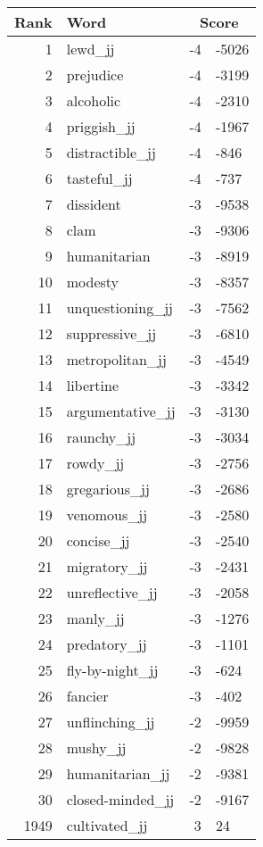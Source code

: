 \begin{longtable}[!htbp]{| rlr@{.}l |}
    \hline
    \textbf{Rank} & \textbf{Word} & \multicolumn{2}{c|}{\textbf{Score}} \\
    \hline
    \endhead
    1 & lewd\_jj & -4 & -5026 \\
    2 & prejudice & -4 & -3199 \\
    3 & alcoholic & -4 & -2310 \\
    4 & priggish\_jj & -4 & -1967 \\
    5 & distractible\_jj & -4 & -846 \\
    6 & tasteful\_jj & -4 & -737 \\
    7 & dissident & -3 & -9538 \\
    8 & clam & -3 & -9306 \\
    9 & humanitarian & -3 & -8919 \\
    10 & modesty & -3 & -8357 \\
    11 & unquestioning\_jj & -3 & -7562 \\
    12 & suppressive\_jj & -3 & -6810 \\
    13 & metropolitan\_jj & -3 & -4549 \\
    14 & libertine & -3 & -3342 \\
    15 & argumentative\_jj & -3 & -3130 \\
    16 & raunchy\_jj & -3 & -3034 \\
    17 & rowdy\_jj & -3 & -2756 \\
    18 & gregarious\_jj & -3 & -2686 \\
    19 & venomous\_jj & -3 & -2580 \\
    20 & concise\_jj & -3 & -2540 \\
    21 & migratory\_jj & -3 & -2431 \\
    22 & unreflective\_jj & -3 & -2058 \\
    23 & manly\_jj & -3 & -1276 \\
    24 & predatory\_jj & -3 & -1101 \\
    25 & fly-by-night\_jj & -3 & -624 \\
    26 & fancier & -3 & -402 \\
    27 & unflinching\_jj & -2 & -9959 \\
    28 & mushy\_jj & -2 & -9828 \\
    29 & humanitarian\_jj & -2 & -9381 \\
    30 & closed-minded\_jj & -2 & -9167 \\
    1949 & cultivated\_jj & 3 & 24 \\

\end{longtable}

